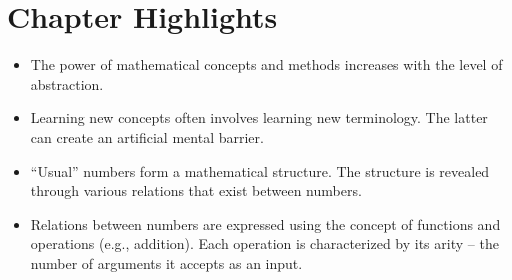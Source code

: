 \section*{Chapter Highlights}
{\chhc
  \it  
\begin{itemize}
\item The power of mathematical concepts and methods increases with
  the level of abstraction.
\item Learning new concepts often involves learning new
  terminology. The latter can create an artificial mental barrier.
\item ``Usual'' numbers form a mathematical structure. The structure
  is revealed through various relations that exist between numbers.
\item Relations between numbers are expressed using the concept of
  functions and operations (e.g., addition). Each operation is
  characterized by its arity -- the number of arguments it accepts as
  an input.
\end{itemize}


}
